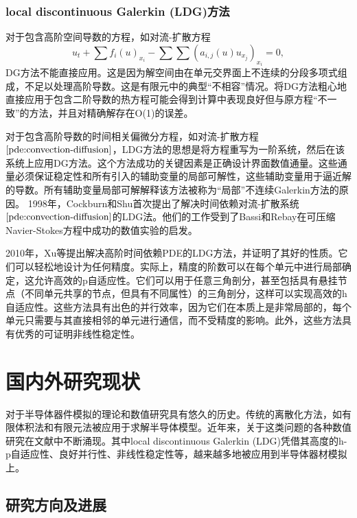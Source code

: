 \subsubsection{local discontinuous Galerkin (LDG)方法}
对于包含高阶空间导数的方程，如对流-扩散方程
\begin{equation}\label{pde:convection-diffusion}
    u_t + \sum f_i(u)_{x_i} - \sum \sum (a_{i,j}(u)u_{x_j})_{x_i} = 0,
\end{equation}
DG方法不能直接应用。这是因为解空间由在单元交界面上不连续的分段多项式组成，不足以处理高阶导数。这是有限元中的典型“不相容”情况。将DG方法粗心地直接应用于包含二阶导数的热方程可能会得到计算中表现良好但与原方程“不一致”的方法，并且对精确解存在O(1)的误差\cite{cockburn2001runge,zhang2003analysis}。

对于包含高阶导数的时间相关偏微分方程，如对流-扩散方程$\eqref{pde:convection-diffusion}$，LDG方法的思想是将方程重写为一阶系统，然后在该系统上应用DG方法。这个方法成功的关键因素是正确设计界面数值通量。这些通量必须保证稳定性和所有引入的辅助变量的局部可解性，这些辅助变量用于逼近解的导数。所有辅助变量局部可解解释该方法被称为“局部”不连续Galerkin方法的原因\cite{cockburn1998local}。
1998年，Cockburn和Shu首次提出了解决时间依赖对流-扩散系统$\eqref{pde:convection-diffusion}$的LDG法\cite{cockburn1998local}。他们的工作受到了Bassi和Rebay在可压缩Navier-Stokes方程中成功的数值实验的启发\cite{bassi1997high}。

2010年，Xu等提出解决高阶时间依赖PDE的LDG方法\cite{xu2010local}，并证明了其好的性质。它们可以轻松地设计为任何精度。实际上，精度的阶数可以在每个单元中进行局部确定，这允许高效的p自适应性。它们可以用于任意三角剖分，甚至包括具有悬挂节点（不同单元共享的节点，但具有不同属性）的三角剖分，这样可以实现高效的h自适应性。这些方法具有出色的并行效率，因为它们在本质上是非常局部的，每个单元只需要与其直接相邻的单元进行通信，而不受精度的影响。此外，这些方法具有优秀的可证明非线性稳定性。

\section{国内外研究现状}
对于半导体器件模拟的理论和数值研究具有悠久的历史。传统的离散化方法，如有限体积法\cite{bank1983numerical,bank1998finite,chainais2003finite,bessemoulin2012finite}和有限元法\cite{brezzi1989two,mauri20153d}被应用于求解半导体模型。近年来，关于这类问题的各种数值研究在文献中不断涌现。其中local discontinuous Galerkin (LDG)凭借其高度的h-p自适应性、良好并行性、非线性稳定性等，越来越多地被应用到半导体器材模拟上。
\subsection{研究方向及进展}

